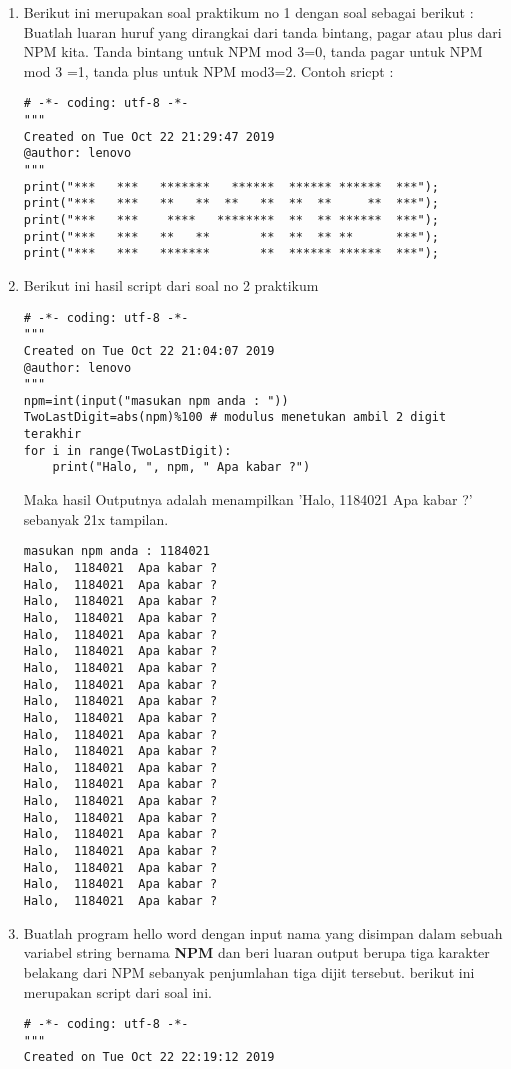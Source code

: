 \begin{enumerate}
\item
Berikut ini merupakan soal praktikum no 1 dengan soal sebagai berikut : \\
Buatlah luaran huruf yang dirangkai dari tanda bintang, pagar atau plus dari NPM kita.
Tanda bintang untuk NPM mod 3=0, tanda pagar untuk NPM mod 3 =1, tanda plus untuk NPM mod3=2.
Contoh sricpt : 
\begin{verbatim}
# -*- coding: utf-8 -*-
"""
Created on Tue Oct 22 21:29:47 2019
@author: lenovo
"""
print("***   ***   *******   ******  ****** ******  ***");
print("***   ***   **   **  **   **  **  **     **  ***");
print("***   ***    ****   ********  **  ** ******  ***");
print("***   ***   **   **       **  **  ** **      ***");
print("***   ***   *******       **  ****** ******  ***");
\end{verbatim}
\item
Berikut ini hasil script dari soal no 2 praktikum
\begin{verbatim}
# -*- coding: utf-8 -*-
"""
Created on Tue Oct 22 21:04:07 2019
@author: lenovo
"""
npm=int(input("masukan npm anda : "))
TwoLastDigit=abs(npm)%100 # modulus menetukan ambil 2 digit terakhir
for i in range(TwoLastDigit):
    print("Halo, ", npm, " Apa kabar ?")
\end{verbatim}
Maka hasil Outputnya adalah menampilkan 'Halo, 1184021 Apa kabar ?' sebanyak 21x tampilan. 
\begin{verbatim}
masukan npm anda : 1184021
Halo,  1184021  Apa kabar ?
Halo,  1184021  Apa kabar ?
Halo,  1184021  Apa kabar ?
Halo,  1184021  Apa kabar ?
Halo,  1184021  Apa kabar ?
Halo,  1184021  Apa kabar ?
Halo,  1184021  Apa kabar ?
Halo,  1184021  Apa kabar ?
Halo,  1184021  Apa kabar ?
Halo,  1184021  Apa kabar ?
Halo,  1184021  Apa kabar ?
Halo,  1184021  Apa kabar ?
Halo,  1184021  Apa kabar ?
Halo,  1184021  Apa kabar ?
Halo,  1184021  Apa kabar ?
Halo,  1184021  Apa kabar ?
Halo,  1184021  Apa kabar ?
Halo,  1184021  Apa kabar ?
Halo,  1184021  Apa kabar ?
Halo,  1184021  Apa kabar ?
Halo,  1184021  Apa kabar ?
\end{verbatim}
\item
Buatlah program hello word dengan input nama yang disimpan dalam sebuah variabel string bernama \textbf{NPM} dan beri luaran output berupa tiga karakter belakang dari NPM sebanyak penjumlahan tiga dijit tersebut. berikut ini merupakan script dari soal ini.
\begin{verbatim}
# -*- coding: utf-8 -*-
"""
Created on Tue Oct 22 22:19:12 2019

\end{verbatim}
\end{enumerate}
